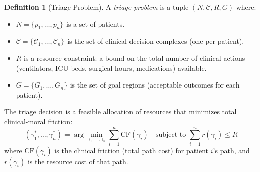 \documentclass[12pt]{article}
\theoremstyle{definition}
\newtheorem{definition}[theorem]{Definition}
\theoremstyle{remark}
\newcommand{\C}{\mathcal{C}}               %
\newcommand{\CF}{\mathrm{CF}}              %
\begin{document}
\begin{definition}[Triage Problem]
\label{def:triage}
A \emph{triage problem} is a tuple $(N, \C, R, G)$ where:
\begin{itemize}
    \item $N = \{p_1, \ldots, p_n\}$ is a set of patients.
    \item $\C = \{\C_1, \ldots, \C_n\}$ is the set of clinical decision complexes (one per patient).
    \item $R$ is a resource constraint: a bound on the total number of clinical actions (ventilators, ICU beds, surgical hours, medications) available.
    \item $G = \{G_1, \ldots, G_n\}$ is the set of goal regions (acceptable outcomes for each patient).
\end{itemize}
The triage decision is a feasible allocation of resources that minimizes total clinical-moral friction:
\begin{equation}
(\gamma_1^*, \ldots, \gamma_n^*) = \arg\min_{\gamma_1, \ldots, \gamma_n} \sum_{i=1}^n \CF(\gamma_i) \quad \text{subject to } \sum_{i=1}^n r(\gamma_i) \leq R
\label{eq:triage}
\end{equation}
where $\CF(\gamma_i)$ is the clinical friction (total path cost) for patient $i$'s path, and $r(\gamma_i)$ is the resource cost of that path.
\end{definition}
\end{document}
